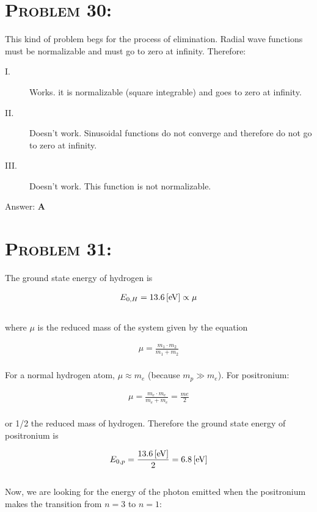 \documentclass{article}
\begin{document}
\section{\textsc{Problem 30:}} This kind of problem begs for the process of elimination. Radial wave functions must be normalizable and must go to zero at infinity. Therefore:

\begin{description}
\item[I.] Works. it is normalizable (square integrable) and goes to zero at infinity.

\item[II.] Doesn't work. Sinusoidal functions do not converge and therefore do not go to zero at infinity.

\item[III.] Doesn't work. This function is not normalizable.
\end{description}
Answer: \textbf{\textcolor{ProcessBlue}A}\\


\section{\textsc{Problem 31:}} The ground state energy of hydrogen is

\begin{gather}
E_{0,H} = \unit[13.6]{[eV]} \propto \mu
\end{gather}
\\
where $\mu$ is the reduced mass of the system given by the equation

\begin{gather}
\mu = \frac{m_{1} \cdot m_{2}}{m_{1} + m_{2}}
\end{gather}
\\
For a normal hydrogen atom, $\mu \approx m_{e}$ (because $m_{p} \gg m_{e}$). For positronium:

\begin{gather}
\mu = \frac{m_{e} \cdot m_{e}}{m_{e} + m_{e}} = \frac{me}{2}\nonumber
\end{gather}
\\
or 1/2 the reduced mass of hydrogen. Therefore the ground state energy of positronium is

\begin{gather}
E_{0,p} = \frac{\unit[13.6]{[eV]}}{2} = \unit[6.8]{[eV]}\nonumber
\end{gather}
\\
Now, we are looking for the energy of the photon emitted when the positronium makes the transition from $n = 3$ to $n = 1$:
\end{document}
